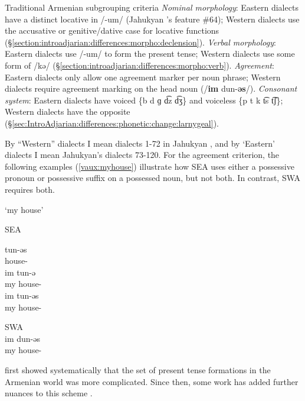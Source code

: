 \documentclass[output=paper]{langscibook}
\begin{document}
\ea Traditional Armenian subgrouping criteria
\ea \emph{Nominal morphology}: Eastern dialects have a distinct locative in /-um/ (Jahukyan \citeyear{Jahukyan-1972-ArmenianDiaolectology}'s feature \#64); Western dialects use the accusative or genitive/dative case for locative functions (\S\ref{section:introadjarian:differences:morpho:declension}). 
\ex \emph{Verbal morphology}: Eastern dialects use /-um/ to form the present tense; Western dialects use some form of /kə/ (\S\ref{section:introadjarian:differences:morpho:verb}). 
\ex \emph{Agreement}: Eastern dialects only allow one agreement marker per noun phrase; Western dialects require agreement marking on the head noun (/\textbf{im} dun-\textbf{əs}/). 
\ex \emph{Consonant system}: Eastern dialects have voiced \{b d ɡ d͡z d͡ʒ\} and voiceless \{p t k t͡s t͡ʃ\}; Western dialects have the opposite (\S\ref{sec:IntroAdjarian:differences:phonetic:change:larnygeal}). 
\z
\z

By “Western” dialects I mean dialects 1-72 in Jahukyan \citeyear{Jahukyan-1972-ArmenianDiaolectology}, and by `Eastern' dialects I mean Jahukyan's dialects 73-120.  For the agreement criterion, the following examples (\ref{vaux:myhouse}) illustrate how SEA uses either a possessive pronoun or possessive suffix on a possessed noun, but not both. In contrast, SWA requires both.

\begin{exe}
\ex `my house'\label{vaux:myhouse}
\begin{xlist}
\ex SEA 
\begin{xlist}
\ex \gll tun-əs \\
        house-{\possFsg} \\
\ex \gll im tun-ə \\
        my house-{} \\
\ex \gll *im tun-əs \\
        my house-{\possFsg} \\
\end{xlist}
\ex SWA \\
\gll  im dun-əs \\
my house-{\possFsg} \\
\end{xlist}
\end{exe}

\citet{Adjarian-1909-ClassificationArmenianDialect} first showed systematically that the set of present tense formations in the Armenian world was more complicated. Since then, some work has added further nuances to this scheme \citep{Gharibyan-1958-SyriaArmenianNewDiscovered,Jahukyan-1972-ArmenianDiaolectology}.
\end{document}
